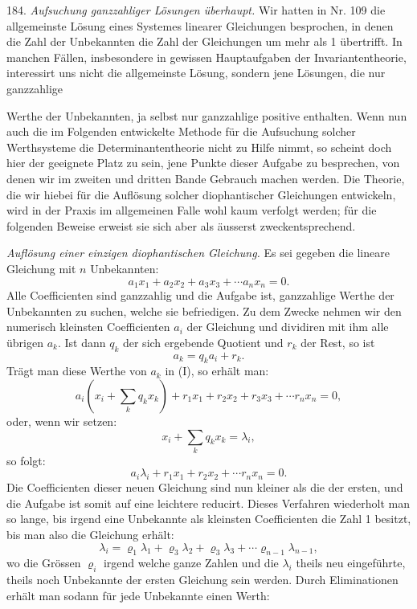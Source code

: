 \documentclass[11pt]{article}
\providecommand{\weberpage}[1]{}
\providecommand{\weq}[2]{\begin{equation}\tag{#1}#2\end{equation}}
\begin{document}
184. \textit{Aufsuchung ganzzahliger Lösungen überhaupt.} Wir hatten in Nr. 109 die allgemeinste Lösung eines Systemes linearer Gleichungen besprochen, in denen die Zahl der Unbekannten die Zahl der Gleichungen um mehr als 1 übertrifft. In manchen Fällen, insbesondere in gewissen Hauptaufgaben der Invariantentheorie, interessirt uns nicht die allgemeinste Lösung, sondern jene Lösungen, die nur ganzzahlige


\weberpage{197}
Werthe der Unbekannten, ja selbst nur ganzzahlige positive enthalten. Wenn nun auch die im Folgenden entwickelte Methode für die Aufsuchung solcher Werthsysteme die Determinantentheorie nicht zu Hilfe nimmt, so scheint doch hier der geeignete Platz zu sein, jene Punkte dieser Aufgabe zu besprechen, von denen wir im zweiten und dritten Bande Gebrauch machen werden. Die Theorie, die wir hiebei für die Auflösung solcher diophantischer Gleichungen entwickeln, wird in der Praxis im allgemeinen Falle wohl kaum verfolgt werden; für die folgenden Beweise erweist sie sich aber als äusserst zweckentsprechend.

\textit{Auflösung einer einzigen diophantischen Gleichung.} Es sei gegeben die lineare Gleichung mit $n$ Unbekannten:
\weq{I}{a_1x_1 + a_2x_2 + a_3x_3 + \cdots a_nx_n = 0.}
Alle Coefficienten sind ganzzahlig und die Aufgabe ist, ganzzahlige Werthe der Unbekannten zu suchen, welche sie befriedigen. Zu dem Zwecke nehmen wir den numerisch kleinsten Coefficienten $a_i$ der Gleichung und dividiren mit ihm alle übrigen $a_k$. Ist dann $q_k$ der sich ergebende Quotient und $r_k$ der Rest, so ist
\[
a_k = q_ka_i + r_k.
\]
Trägt man diese Werthe von $a_k$ in (I), so erhält man:
\[
a_i\left(x_i + \sum_k q_kx_k\right) + r_1x_1 + r_2x_2 + r_3x_3 + \cdots r_nx_n = 0,
\]
oder, wenn wir setzen:
\[
x_i + \sum_k q_kx_k = \lambda_i,
\]
so folgt:
\weq{II}{a_i\lambda_i + r_1x_1 + r_2x_2 + \cdots r_nx_n = 0.}
Die Coefficienten dieser neuen Gleichung sind nun kleiner als die der ersten, und die Aufgabe ist somit auf eine leichtere reducirt. Dieses Verfahren wiederholt man so lange, bis irgend eine Unbekannte als kleinsten Coefficienten die Zahl 1 besitzt, bis man also die Gleichung erhält:
\weq{III}{\lambda_i = \varrho_1\lambda_1 + \varrho_3\lambda_2 + \varrho_3\lambda_3 + \cdots \varrho_{n-1}\lambda_{n-1},} %
wo die Grössen $\varrho_i$ irgend welche ganze Zahlen und die $\lambda_i$ theils neu eingeführte, theils noch Unbekannte der ersten Gleichung sein werden. Durch Eliminationen erhält man sodann für jede Unbekannte einen Werth:
\end{document}
